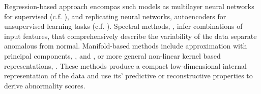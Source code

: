 \documentclass{extarticle}
\begin{document}
Regression-based approach encompas such models as multilayer neural networks for
supervised (c.f. \cite{augusteijn2002}), and replicating neural networks, autoencoders
for unsupervised learning tasks (c.f. \cite{hawkins2002,williams2002}). Spectral
methods, \cite{chandola2009}, infer combinations of input features, that comprehensively
describe the variability of the data separate anomalous from normal. Manifold-based
methods include approximation with principal components, \cite{dutta2007,shyu2003},
and \cite{jolliffe2014}, or more general non-linear kernel based representations,
\cite{hoffmann2007,scholkopf1998}. These methods produce a compact low-dimensional
internal representation of the data and use its' predictive or reconstructive properties
to derive abnormality scores.


\end{document}
